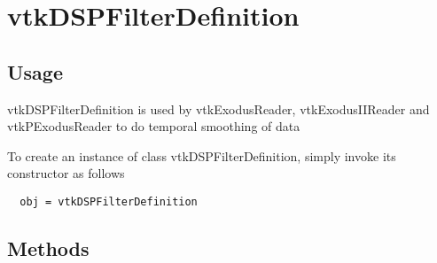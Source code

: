 \section{vtkDSPFilterDefinition}

\subsection{Usage}

 vtkDSPFilterDefinition is used by vtkExodusReader, vtkExodusIIReader and
 vtkPExodusReader to do temporal smoothing of data

To create an instance of class vtkDSPFilterDefinition, simply
invoke its constructor as follows
\begin{verbatim}
  obj = vtkDSPFilterDefinition
\end{verbatim}
\subsection{Methods}

